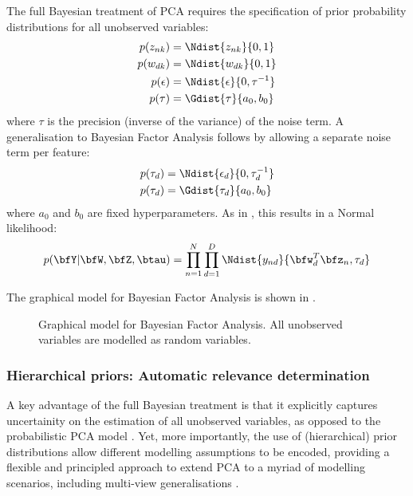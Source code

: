 The full Bayesian treatment of PCA requires the specification of prior probability distributions for all unobserved variables:
\begin{align*}
	p(z_{nk}) &= \Ndist{z_{nk}}{0,1} \\
	p(w_{dk}) &= \Ndist{w_{dk}}{0,1} \\
	p(\epsilon) &= \Ndist {\epsilon}{0,\tau^{-1}} \\
	p(\tau) &= \Gdist{\tau}{a_0,b_0}
\end{align*}
where $\tau$ is the precision (inverse of the variance) of the noise term. A generalisation to Bayesian Factor Analysis follows by allowing a separate noise term per feature:
\begin{align*}
	p(\tau_d) &= \Ndist {\epsilon_d}{0,\tau_d^{-1}} \\
	p(\tau_d) &= \Gdist{\tau_d}{a_0,b_0}
\end{align*}
where $a_0$ and $b_0$ are fixed hyperparameters. As in , this results in a Normal likelihood:
\[
	p(\bfY|\bfW,\bfZ,\btau) = \prod_{n=1}^{N} \prod_{d=1}^{D} \Ndist{y_{nd}}{\bfw_{d}^T \bfz_{n},\tau_d}
\]

The graphical model for Bayesian Factor Analysis is shown in .
\begin{figure}[H] 
	\centering
	
	\caption{Graphical model for Bayesian Factor Analysis. All unobserved variables are modelled as random variables.}
	\label{fig:bayesianFA}
\end{figure}

\subsubsection{Hierarchical priors: Automatic relevance determination}
A key advantage of the full Bayesian treatment is that it explicitly captures uncertainity on the estimation of all unobserved variables, as opposed to the probabilistic PCA model \cite{Bishop1999a,Bishop1999b}. Yet, more importantly, the use of (hierarchical) prior distributions allow different modelling assumptions to be encoded, providing a flexible and principled approach to extend PCA to a myriad of modelling scenarios, including multi-view generalisations \cite{Klami2008,Virtanen2012,Klami2015,Bunte2016,Khan2014,Zhao2016}.\\

